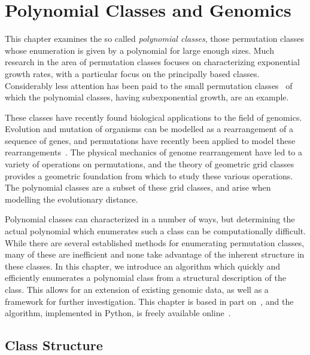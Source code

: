 \chapter{Polynomial Classes and Genomics}
\label{chap:polyclass}


  This chapter examines the so called \emph{polynomial classes}, those
  permutation classes whose enumeration is given by a polynomial for large
  enough sizes. Much research in the area of permutation classes focuses on
  characterizing exponential growth rates, with a particular
  focus on the principally based classes. Considerably less attention has been
  paid to the small permutation classes~\cite{Vatter2011,Vatter2010} of which the
  polynomial classes, having subexponential growth, are an example. 

  These classes have recently found biological applications to the field of
  genomics. Evolution and mutation of organisms can be modelled as a
  rearrangement of a sequence of genes, and permutations have recently been
  applied to model these rearrangements~\cite{GenomeBook}. The physical
  mechanics of genome rearrangement have led to a variety of operations on
  permutations, and the theory of geometric grid classes~\cite{GridClasses}
  provides a geometric foundation from which to study these various operations.
  The polynomial classes are a subset of these grid classes, and arise when
  modelling the evolutionary distance. 

  Polynomial classes can characterized in a number of ways, but determining the
  actual polynomial which enumerates such a class can be computationally
  difficult. While there are several established methods for enumerating
  permutation classes, many of these are inefficient and none take advantage of
  the inherent structure in these classes.  In this chapter, we introduce an
  algorithm which quickly and efficiently enumerates a polynomial class from a
  structural description of the class.  This allows for an extension of
  existing genomic data, as well as a framework for further investigation. This
  chapter is based in part on~\cite{me-polyclass}, and the algorithm,
  implemented in Python, is freely available online~\cite{polyclass-algo}. 
  


\section{Class Structure}
\label{polyclass:sec:gridclasses}


